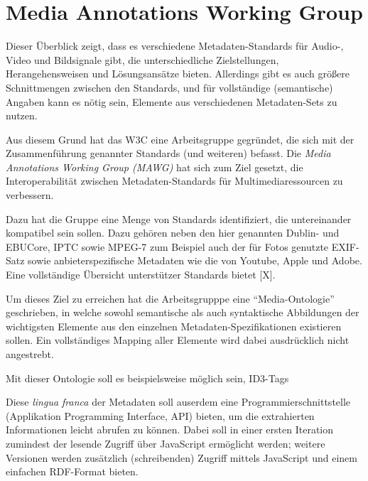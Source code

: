 	

	\newpage
	
	\section{Media Annotations Working Group}
	Dieser Überblick zeigt, dass es verschiedene Metadaten-Standards für Audio-, Video und Bildsignale gibt, die unterschiedliche Zielstellungen, Herangehensweisen und Lösungsansätze bieten. Allerdings gibt es auch größere Schnittmengen zwischen den Standards, und für vollständige (semantische) Angaben kann es nötig sein, Elemente aus verschiedenen Metadaten-Sets zu nutzen.
	
	Aus diesem Grund hat das W3C eine Arbeitsgruppe gegründet, die sich mit der Zusammenführung genannter Standards (und weiteren) befasst. Die \emph{Media Annotations Working Group (MAWG)} hat sich zum Ziel gesetzt, die Interoperabilität zwischen Metadaten-Standards für Multimediaressourcen zu verbessern.
	
	Dazu hat die Gruppe eine Menge von Standards identifiziert, die untereinander kompatibel sein sollen. Dazu gehören neben den hier genannten Dublin- und EBUCore, IPTC %
	sowie MPEG-7 zum Beispiel auch der für Fotos genutzte EXIF-Satz sowie anbieterspezifische Metadaten wie die von Youtube, Apple und Adobe. Eine vollständige Übersicht unterstützer Standards bietet [X]. %
	
	Um dieses Ziel zu erreichen hat die Arbeitsgrupppe eine \enquote{Media-Ontologie} geschrieben, in welche sowohl semantische als auch syntaktische Abbildungen der wichtigsten Elemente aus den einzelnen Metadaten-Spezifikationen existieren sollen. Ein vollständiges Mapping aller Elemente wird dabei ausdrücklich nicht angestrebt.
	
	Mit dieser Ontologie soll es beispielsweise möglich sein, ID3-Tags 
	
	Diese \emph{lingua franca} der Metadaten soll auserdem eine Programmierschnittstelle (Applikation Programming Interface, API) bieten, um die extrahierten Informationen leicht abrufen zu können. Dabei soll in einer ersten Iteration zumindest der lesende Zugriff über JavaScript ermöglicht werden; weitere Versionen werden zusätzlich (schreibenden) Zugriff mittels JavaScript und einem einfachen RDF-Format bieten.
	
	

	
	
